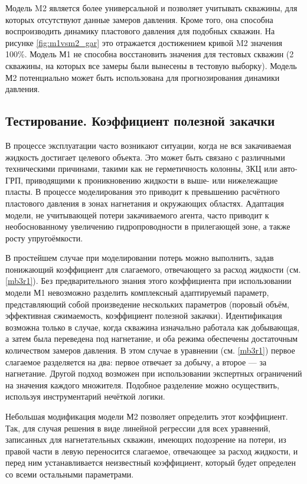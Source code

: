 \documentclass[14pt]{article}
\begin{document}
Модель M2 является более универсальной и позволяет учитывать скважины, для которых отсутствуют данные замеров давления. Кроме того, она способна воспроизводить динамику пластового давления для подобных скважин.
На рисунке \ref{fig:m1vsm2_gar} это отражается достижением кривой M2 значения 100\%. Модель М1 не способна восстановить значения для тестовых скважин (2 скважины, на которых все замеры были вынесены в тестовую выборку).
Модель М2 потенциально может быть использована для прогнозирования динамики давления.

\newpage


\subsection{Тестирование. Коэффициент полезной закачки}
В процессе эксплуатации часто возникают ситуации, когда не вся закачиваемая жидкость достигает целевого объекта. Это может быть связано с различными техническими причинами, такими как не герметичность колонны, ЗКЦ или авто-ГРП, приводящими к проникновению жидкости в выше- или нижележащие пласты.
В процессе моделирования это приводит к превышению расчётного пластового давления в зонах нагнетания и окружающих областях. Адаптация модели, не учитывающей потери закачиваемого агента, часто приводит к необоснованному увеличению гидропроводности в прилегающей зоне, а также росту упругоёмкости.

В простейшем случае при моделировании потерь можно выполнить, задав понижающий коэффициент для слагаемого, отвечающего за расход жидкости (см. \ref{mb3r1}). Без предварительного знания этого коэффициента при использовании модели М1 невозможно разделить комплексный адаптируемый параметр, представляющий собой произведение нескольких параметров (поровый объём, эффективная сжимаемость, коэффициент полезной закачки). Идентификация возможна только в случае, когда скважина изначально работала как добывающая, а затем была переведена под нагнетание, и оба режима обеспечены достаточным количеством замеров давления. В этом случае в уравнении (см. \ref{mb3r1}) первое слагаемое разделяется на два: первое отвечает за добычу, а второе — за нагнетание.
Другой подход возможен при использовании экспертных ограничений на значения каждого множителя. Подобное разделение можно осуществить, используя инструментарий нечёткой логики.

Небольшая модификация модели М2 позволяет определить этот коэффициент. Так, для случая решения в виде линейной регрессии для всех уравнений, записанных для нагнетательных скважин, имеющих подозрение на потери, из правой части в левую переносится слагаемое, отвечающее за расход жидкости, и перед ним устанавливается неизвестный коэффициент, который будет определен со всеми остальными параметрами.
\end{document}
